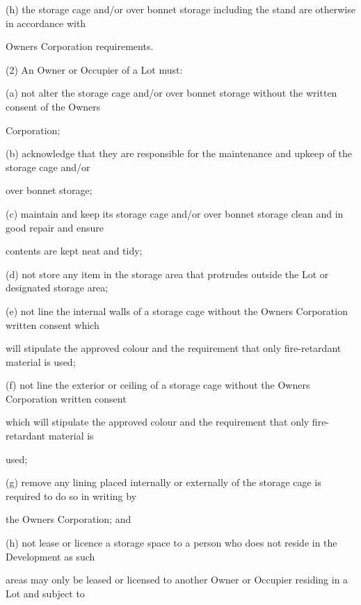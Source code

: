\documentclass{article}
\begin{document}
{\fontsize{9.962}{1}(h) the storage cage and/or over bonnet storage including the stand are otherwise in accordance with }

{\fontsize{10.02}{1}Owners Corporation requirements. }

{\fontsize{9.962}{1}(2) An Owner or Occupier of a Lot must: }

{\fontsize{9.962}{1}(a) not alter the storage cage and/or over bonnet storage without the written consent of the Owners }

{\fontsize{10.02}{1}Corporation; }

{\fontsize{9.962}{1}(b) acknowledge that they are responsible for the maintenance and upkeep of the storage cage and/or }

{\fontsize{10.02}{1}over bonnet storage; }

{\fontsize{9.962}{1}(c) maintain and keep its storage cage and/or over bonnet storage clean and in good repair and ensure }

{\fontsize{10.02}{1}contents are kept neat and tidy; }

{\fontsize{9.962}{1}(d) not store any item in the storage area that protrudes outside the Lot or designated storage area; }

{\fontsize{9.962}{1}(e) not line the internal walls of a storage cage without the Owners Corporation written consent which }

{\fontsize{10.02}{1}will stipulate the approved colour and the requirement that only fire-retardant material is used; }

{\fontsize{9.962}{1}(f) not line the exterior or ceiling of a storage cage without the Owners Corporation written consent }

{\fontsize{10.02}{1}which will stipulate the approved colour and the requirement that only fire-retardant material is }

{\fontsize{10.02}{1}used; }

{\fontsize{9.962}{1}(g) remove any lining placed internally or externally of the storage cage is required to do so in writing by }

{\fontsize{10.02}{1}the Owners Corporation; and }

{\fontsize{9.962}{1}(h) not lease or licence a storage space to a person who does not reside in the Development as such }

{\fontsize{10.02}{1}areas may only be leased or licensed to another Owner or Occupier residing in a Lot and subject to }

\newpage
\end{document}
